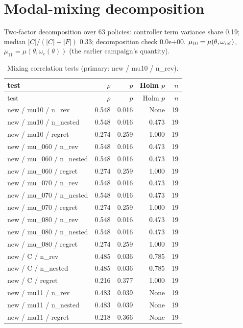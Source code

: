 \documentclass[10pt,a4paper]{article}
\begin{document}
\section{Modal-mixing decomposition}
Two-factor decomposition over 63 policies: controller term variance share 0.19; median $|C|/(|C|+|F|)$ 0.33; decomposition check 0.0e+00. $\mu_{10}=\mu(\theta,\omega_{\rm ref})$, $\mu_{11}=\mu(\theta,\omega_c(\theta))$ (the earlier campaign's quantity).

{\scriptsize
\begin{longtable}{lrrrr}
\caption{Mixing correlation tests (primary: new / mu10 / n\_rev).}\label{tab:s-mix}\\
\toprule
test & $\rho$ & $p$ & Holm $p$ & $n$ \\
\midrule
\endfirsthead
\toprule
test & $\rho$ & $p$ & Holm $p$ & $n$ \\
\midrule
\endhead
new / mu10 / n\_rev & 0.548 & 0.016 & None & 19 \\
new / mu10 / n\_nested & 0.548 & 0.016 & 0.473 & 19 \\
new / mu10 / regret & 0.274 & 0.259 & 1.000 & 19 \\
new / mu\_060 / n\_rev & 0.548 & 0.016 & 0.473 & 19 \\
new / mu\_060 / n\_nested & 0.548 & 0.016 & 0.473 & 19 \\
new / mu\_060 / regret & 0.274 & 0.259 & 1.000 & 19 \\
new / mu\_070 / n\_rev & 0.548 & 0.016 & 0.473 & 19 \\
new / mu\_070 / n\_nested & 0.548 & 0.016 & 0.473 & 19 \\
new / mu\_070 / regret & 0.274 & 0.259 & 1.000 & 19 \\
new / mu\_080 / n\_rev & 0.548 & 0.016 & 0.473 & 19 \\
new / mu\_080 / n\_nested & 0.548 & 0.016 & 0.473 & 19 \\
new / mu\_080 / regret & 0.274 & 0.259 & 1.000 & 19 \\
new / C / n\_rev & 0.485 & 0.036 & 0.785 & 19 \\
new / C / n\_nested & 0.485 & 0.036 & 0.785 & 19 \\
new / C / regret & 0.216 & 0.377 & 1.000 & 19 \\
new / mu11 / n\_rev & 0.483 & 0.039 & None & 19 \\
new / mu11 / n\_nested & 0.483 & 0.039 & None & 19 \\
new / mu11 / regret & 0.218 & 0.366 & None & 19 \\

\end{longtable}}
\end{document}
